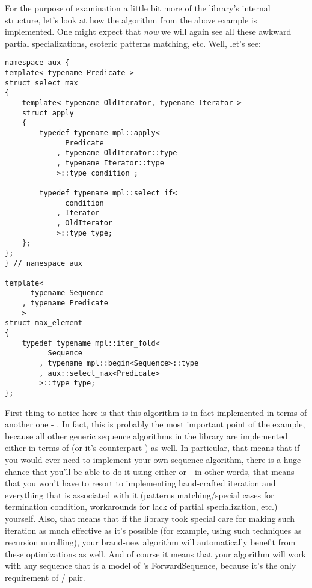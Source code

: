 \documentclass{netobjectdays}
\begin{document}
For the purpose of examination a little bit more of the 
library's internal structure, let's look at how the 
 algorithm from the above example is 
implemented. One might expect that \emph{now} we will again 
see all these awkward partial specializations, esoteric 
patterns matching, etc. Well, let's see:

{\footnotesize
\begin{verbatim}
namespace aux {
template< typename Predicate >
struct select_max
{
    template< typename OldIterator, typename Iterator >
    struct apply
    {
        typedef typename mpl::apply<
              Predicate
            , typename OldIterator::type
            , typename Iterator::type
            >::type condition_;

        typedef typename mpl::select_if<
              condition_
            , Iterator
            , OldIterator
            >::type type;
    };
};
} // namespace aux 

template<
      typename Sequence
    , typename Predicate
    >
struct max_element
{
    typedef typename mpl::iter_fold<    
          Sequence
        , typename mpl::begin<Sequence>::type
        , aux::select_max<Predicate>
        >::type type;
};
\end{verbatim}
}

First thing to notice here is that this algorithm is in fact 
implemented in terms of another one - . 
In fact, this is probably the most important point of the 
example, because all other generic sequence algorithms in 
the library are implemented either in terms of 
(or it's counterpart ) as well. In particular, 
that means that if you would ever need to implement your own 
sequence algorithm, there is a huge chance that you'll be able 
to do it using either  or  - 
in other words, that means that you won't have to resort to 
implementing hand-crafted iteration and everything that is 
associated with it (patterns matching/special cases for 
termination condition, workarounds for lack of partial 
specialization, etc.) yourself. Also, that means that if the 
library took special care for making such iteration as much 
effective as it's possible (for example, using such techniques 
as recursion unrolling), your brand-new algorithm will 
automatically benefit from these optimizations as well. And of 
course it means that your algorithm will work with any 
sequence that is a model of 's 
ForwardSequence, because it's the only requirement of 
/ pair.
\end{document}
